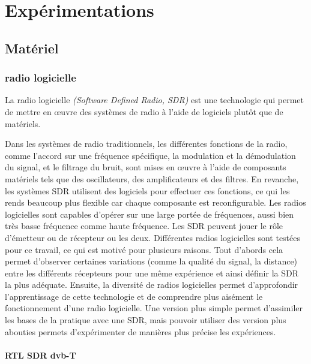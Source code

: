 \chapter{Expérimentations}


\renewcommand{\leftmark}{EXPERIMENTATIONS}

\section{Matériel}

\subsection{radio logicielle}

La radio logicielle \textit{(Software Defined Radio, SDR)} est une technologie qui permet de mettre en œuvre des systèmes de radio à l'aide de logiciels plutôt que de matériels. 

\vspace{0.1cm}

Dans les systèmes de radio traditionnels, les différentes fonctions de la radio, comme l'accord sur une fréquence spécifique, la modulation et la démodulation du signal, et le filtrage du bruit, sont mises en œuvre à l'aide de composants matériels tels que des oscillateurs, des amplificateurs et des filtres. En revanche, les systèmes SDR utilisent des logiciels pour effectuer ces fonctions, ce qui les rends beaucoup plus flexible car chaque composante est reconfigurable. Les radios logicielles sont capables d'opérer sur une large portée de fréquences, aussi bien très basse fréquence comme haute fréquence.
Les SDR peuvent jouer le rôle d'émetteur ou de récepteur ou les deux. Différentes radios logicielles sont testées pour ce travail, ce qui est motivé pour plusieurs raisons. Tout d'abords cela permet d'observer certaines variations (comme la qualité du signal, la distance) entre les différents récepteurs pour une même expérience et ainsi définir la SDR la plus adéquate. Ensuite, la diversité de radios logicielles permet d'approfondir l'apprentissage de cette technologie et de comprendre plus aisément le fonctionnement d'une radio logicielle. Une version plus simple permet d'assimiler les bases de la pratique avec une SDR, mais pouvoir utiliser des version plus abouties permets d'expérimenter de manières plus précise les expériences.

\newpage

\subsubsection{RTL SDR dvb-T}

